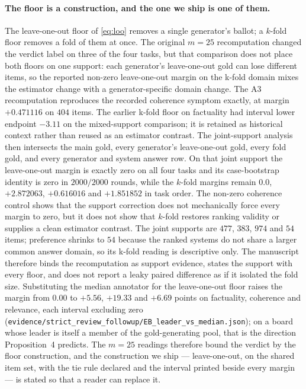 \documentclass{article}
\newcommand{\ids}[1]{\texttt{\small #1}} %
\begin{document}
\paragraph{The floor is a construction, and the one we ship is one of them.} The leave-one-out floor of \eqref{eq:loo} removes a single generator's ballot; a $k$-fold floor removes a fold of them at once. The original $m=25$ recomputation changed the verdict label on three of the four tasks, but that comparison does not place both floors on one support: each generator's leave-one-out gold can lose different items, so the reported non-zero leave-one-out margin on the k-fold domain mixes the estimator change with a generator-specific domain change. The A3 recomputation reproduces the recorded coherence symptom exactly, at margin $+0.471116$ on $404$ items. The earlier k-fold floor on factuality had interval lower endpoint $-3.11$ on the mixed-support comparison; it is retained as historical context rather than reused as an estimator contrast. The joint-support analysis then intersects the main gold, every generator's leave-one-out gold, every fold gold, and every generator and system answer row. On that joint support the leave-one-out margin is exactly zero on all four tasks and its case-bootstrap identity is zero in $2000/2000$ rounds, while the $k$-fold margins remain $0.0$, $+2.872063$, $+0.616016$ and $+1.851852$ in task order. The non-zero coherence control shows that the support correction does not mechanically force every margin to zero, but it does not show that $k$-fold restores ranking validity or supplies a clean estimator contrast. The joint supports are $477$, $383$, $974$ and $54$ items; preference shrinks to $54$ because the ranked systems do not share a larger common answer domain, so its k-fold reading is descriptive only. The manuscript therefore binds the recomputation as support evidence, states the support with every floor, and does not report a leaky paired difference as if it isolated the fold size. Substituting the median annotator for the leave-one-out floor raises the margin from $0.00$ to $+5.56$, $+19.33$ and $+6.69$ points on factuality, coherence and relevance, each interval excluding zero (\ids{evidence/strict\_review\_followup/EB\_leader\_vs\_median.json}); on a board whose leader is itself a member of the gold-generating pool, that is the direction Proposition~4 predicts. The $m=25$ readings therefore bound the verdict by the floor construction, and the construction we ship --- leave-one-out, on the shared item set, with the tie rule declared and the interval printed beside every margin --- is stated so that a reader can replace it.
\end{document}
